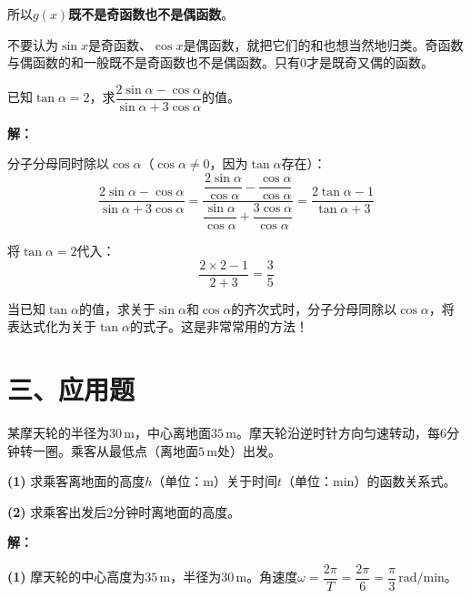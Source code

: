 \documentclass[12pt, a4paper]{ctexart}
\begin{document}
所以$g(x)$\textbf{既不是奇函数也不是偶函数}。

\begin{warnbox}[易错提醒]
不要认为$\sin x$是奇函数、$\cos x$是偶函数，就把它们的和也想当然地归类。奇函数与偶函数的和一般既不是奇函数也不是偶函数。只有$0$才是既奇又偶的函数。
\end{warnbox}

\begin{examplebox}[【例题12】同角关系与诱导公式的综合运用]
已知$\tan\alpha=2$，求$\dfrac{2\sin\alpha-\cos\alpha}{\sin\alpha+3\cos\alpha}$的值。
\end{examplebox}

\textbf{解：}

分子分母同时除以$\cos\alpha$（$\cos\alpha\neq0$，因为$\tan\alpha$存在）：
\[
  \frac{2\sin\alpha-\cos\alpha}{\sin\alpha+3\cos\alpha}
  =\frac{\dfrac{2\sin\alpha}{\cos\alpha}-\dfrac{\cos\alpha}{\cos\alpha}}{\dfrac{\sin\alpha}{\cos\alpha}+\dfrac{3\cos\alpha}{\cos\alpha}}
  =\frac{2\tan\alpha-1}{\tan\alpha+3}
\]

将$\tan\alpha=2$代入：
\[
  \frac{2\times2-1}{2+3}=\frac{3}{5}
\]

\begin{tipbox}[方法总结]
当已知$\tan\alpha$的值，求关于$\sin\alpha$和$\cos\alpha$的齐次式时，分子分母同除以$\cos\alpha$，将表达式化为关于$\tan\alpha$的式子。这是非常常用的方法！
\end{tipbox}

\newpage
\section*{\textcolor{apppurple}{三、应用题}}

\begin{appbox}[【应用1】摩天轮问题]
某摩天轮的半径为$30\,\text{m}$，中心离地面$35\,\text{m}$。摩天轮沿逆时针方向匀速转动，每$6$分钟转一圈。乘客从最低点（离地面$5\,\text{m}$处）出发。

\textbf{(1)} 求乘客离地面的高度$h$（单位：$\text{m}$）关于时间$t$（单位：$\text{min}$）的函数关系式。

\textbf{(2)} 求乘客出发后$2$分钟时离地面的高度。
\end{appbox}

\textbf{解：}

\textbf{(1)} 摩天轮的中心高度为$35\,\text{m}$，半径为$30\,\text{m}$。角速度$\omega=\dfrac{2\pi}{T}=\dfrac{2\pi}{6}=\dfrac{\pi}{3}\,\text{rad/min}$。
\end{document}
